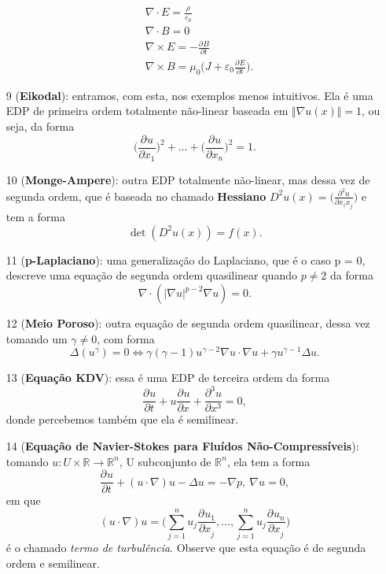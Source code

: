 \documentclass[../pde_notes.tex]{subfiles}
\begin{document}
\begin{example}
\begin{itemize}
		      \begin{align*}
			       & \nabla \cdot E = \frac{\rho }{\varepsilon_{0}}                                                  \\
			       & \nabla \cdot B = 0                                                                              \\
			       & \nabla \times E = - \frac{\partial^{}B}{\partial t^{}}                                          \\
			       & \nabla \times B = \mu_{0} \biggl(J + \varepsilon_{0} \frac{\partial^{}E}{\partial t^{}}\biggr).
		      \end{align*}
		\item[9](\textbf{Eikodal}): entramos, com esta, nos exemplos menos intuitivos. Ela é uma EDP de primeira ordem totalmente não-linear baseada em \(\Vert \nabla{u(x)} \Vert = 1\), ou seja, da forma
		      \[
			      \biggl(\frac{\partial^{}u}{\partial x_{1}^{}}\biggr)^{2}+\dotsc + \biggl(\frac{\partial^{}u}{\partial x_{n}^{}}\biggr)^{2} = 1.
		      \]
		\item[10](\textbf{Monge-Ampere}): outra EDP totalmente não-linear, mas dessa vez de segunda ordem, que é baseada no chamado \textbf{Hessiano} \(D^{2}u(x) = \biggl(\frac{\partial^{2}u}{\partial x_{i}x_{j}^{}}\biggr)\) e tem a forma
		      \[
			      \det{(D^{2}u(x))} = f(x).
		      \]
		\item[11](\textbf{p-Laplaciano}): uma generalização do Laplaciano, que é o caso p = 0, descreve uma equação de segunda ordem quasilinear quando \(p\neq 2\) da forma
		      \[
			      \nabla \cdot (|\nabla u|^{p-2}\nabla u) = 0.
		      \]
		\item[12](\textbf{Meio Poroso}): outra equação de segunda ordem quasilinear, dessa vez tomando um \(\gamma \neq 0\), com forma
		      \[
			      \Delta (u^{\gamma }) = 0 \Longleftrightarrow \gamma(\gamma -1)u^{\gamma -2}\nabla u \cdot \nabla u + \gamma u^{\gamma -1}\Delta u.
		      \]
		\item[13](\textbf{Equação KDV}): essa é uma EDP de terceira ordem da forma
		      \[
			      \frac{\partial^{}u}{\partial t^{}} + u \frac{\partial^{}u}{\partial x^{}} + \frac{\partial^{3}u}{\partial x^{3}} = 0,
		      \]
		      donde percebemos também que ela é semilinear.
		\item[14](\textbf{Equação de Navier-Stokes para Fluídos Não-Compressíveis}): tomando \(u:U\times \mathbb{R}\rightarrow \mathbb{R}^{n}\), U subconjunto de \(\mathbb{R}^{n}\), ela tem a forma
		      \[
			      \frac{\partial^{}u}{\partial t^{}} + (u \cdot \nabla)u - \Delta u = -\nabla p,\: \nabla u = 0,
		      \]
		      em que
		      \[
			      (u \cdot \nabla)u = \biggl(\sum\limits_{j=1}^{n}u_{j}\frac{\partial^{}u_{1}}{\partial x_{j}^{}},\dotsc , \sum\limits_{j=1}^{n}u_{j}\frac{\partial^{}u_{n}}{\partial x_{j}^{}}\biggr)
		      \]
		      é o chamado \textit{termo de turbulência}. Observe que esta equação é de segunda ordem e semilinear.
	\end{itemize}
\end{example}
\end{document}
